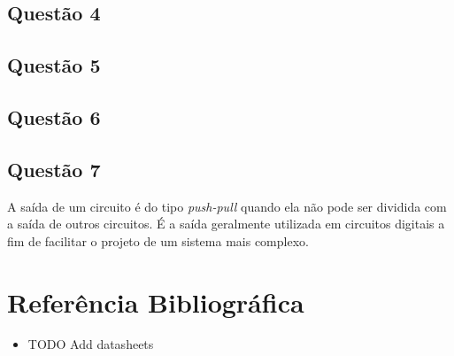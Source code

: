 \documentclass[12pt, a4paper, twoside]{article}
\begin{document}
\subsection{Questão 4}

\subsection{Questão 5}

\subsection{Questão 6}


\subsection{Questão 7}

A saída de um circuito é do tipo \textit{push-pull} quando ela não pode ser dividida com a saída de outros circuitos. É a saída geralmente utilizada em circuitos digitais a fim de facilitar o projeto de um sistema mais complexo.

\section{Referência Bibliográfica}

\begin{itemize}
    \item TODO Add datasheets
\end{itemize}
\end{document}

